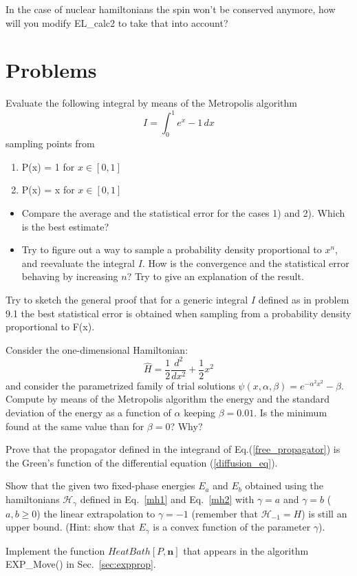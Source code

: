In the case of nuclear hamiltonians the spin won't be conserved anymore, how will you modify EL\_calc2 to take that into account?

\section{Problems}
 \begin{prob}
  Evaluate the following integral by means of the Metropolis algorithm
  \[
  I=\int_0^1 e^{x}-1\, dx
  \]
  sampling points from
  \begin{enumerate}
  	\item P(x) = 1 for $x\in[0,1]$
  	\item P(x) = x for $x\in[0,1]$
  \end{enumerate}
  \begin{itemize}
  	\item
  Compare the average and the statistical error for the cases 1) and 2). Which is the best estimate?
  \item
  Try to figure out a way to sample a probability density proportional to $x^n$, and reevaluate the integral
  $I$. How is the convergence and the statistical error behaving by increasing $n$? Try to give an explanation of the result.  
  \end{itemize}
  \end{prob}
  \begin{prob}
  Try to sketch the general proof that for a generic integral $I$ defined as in problem 9.1 the best statistical error is obtained when sampling from a probability density proportional to F(x).
  \end{prob}
  \begin{prob}
  Consider the one-dimensional Hamiltonian:
  \[
  \hat{H}=\frac{1}{2}\frac{d^2}{dx^2}+\frac{1}{2}x^2
  \]
  and consider the parametrized family of trial solutions $\psi(x,\alpha,\beta)=e^{-\alpha^2 x^2}-\beta$. Compute by means of the  Metropolis algorithm the energy and the standard deviation of the energy as a function of $\alpha$ keeping $\beta=0.01$. Is the minimum found at the same value than for $\beta =0$? Why?
  \end{prob}
  \begin{prob}
  	Prove that the propagator defined in the integrand of Eq.(\ref{free_propagator}) is the Green's function of the differential equation (\ref{diffusion_eq}).
  \end{prob}
  \begin{prob}
  \label{prob:egamma}
	Show that the given two fixed-phase energies $E_{a}$ and $E_{b}$ obtained using the hamiltonians $\mathcal{H}_{\gamma}$ defined in Eq.~\eqref{mh1} and Eq.~\eqref{mh2} 
	with $\gamma=a$ and $\gamma=b$ ($a,b\geq 0$) the linear extrapolation to $\gamma=-1$ (remember that $\mathcal{H}_{-1}=H$) is still an upper bound. 
	(Hint: show that $E_\gamma$ is a convex function of the parameter $\gamma$).
  \end{prob}
  \begin{prob}
  \label{prob:heatbath}
        Implement the function $HeatBath[P,\mathbf{n}]$ that appears in the algorithm EXP\_Move() in Sec.~\ref{sec:expprop}.
  \end{prob}


